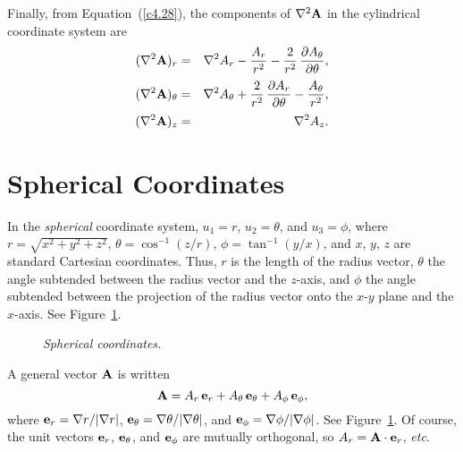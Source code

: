 Finally, from Equation~(\ref{c4.28}), the components of $\nabla^2{\bf A}$ in the
cylindrical coordinate system are
\begin{eqnarray}
(\nabla^2{\bf A})_r &=&\nabla^2 A_r - \frac{A_r}{r^2} - \frac{2}{r^2}\,\frac{\partial A_\theta}{\partial\theta},\\[0.5ex]
(\nabla^2{\bf A})_\theta &=& \nabla^2 A_\theta + \frac{2}{r^2}\,\frac{\partial A_r}{\partial \theta}-\frac{A_\theta}{r^2},\\[0.5ex]
(\nabla^2{\bf A})_z &=&\nabla^2 A_z.
\end{eqnarray}

\section{Spherical Coordinates}\label{ssph}
In the {\em spherical}\/ coordinate system, $u_1=r$, $u_2=\theta$, and $u_3=\phi$, 
 where $r=\sqrt{x^2+y^2+z^2}$,  $\theta=\cos^{-1}(z/r)$,  $\phi=\tan^{-1}(y/x)$, and $x$, $y$, $z$ are standard Cartesian coordinates. 
Thus, $r$ is the length of the radius vector,  $\theta$
the angle subtended between the radius vector and the $z$-axis,  and $\phi$ the angle subtended between the projection of the radius vector
onto the $x$-$y$ plane and the $x$-axis. See Figure~\ref{fsphx}.

\begin{figure}
\epsfysize=2.75in
\centerline{}
\caption{\em Spherical coordinates.}\label{fsphx}
\end{figure}

A general  vector ${\bf A}$ is written
\begin{equation}
{\bf A} = A_r\,{\bf e}_r+ A_\theta\,{\bf e}_\theta + A_\phi\,{\bf e}_\phi,
\end{equation}
where ${\bf e}_r=\nabla r/|\nabla r|$, ${\bf e}_\theta = \nabla\theta/|\nabla\theta|$, and ${\bf e}_\phi=\nabla \phi/|\nabla \phi|$. See Figure~\ref{fsphx}. Of course, the unit vectors
${\bf e}_r$, ${\bf e}_\theta$, and ${\bf e}_\phi$ are mutually orthogonal, so
$A_r = {\bf A}\cdot {\bf e}_r$, {\em etc.} 

